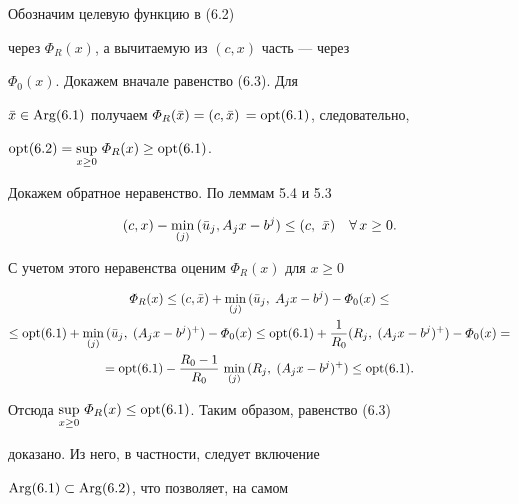 \begin{pf} Обозначим целевую функцию в (6.2)


через $\varPhi_R (x)$, а вычитаемую из $(c, x)$ часть --- через


$\varPhi_0 (x)$. Докажем вначале равенство (6.3). Для


$\Bar{x} \in\Arg(6.1)$ получаем $\varPhi_R (\Bar{x}) =


(c, \Bar{x})\, =\opt(6.1)$, следовательно,


$\operatorname{opt}(6.2)=\sup\limits_{x \ge 0}\, \varPhi_R (x) \ge\operatorname{opt}(6.1)$.





Докажем обратное неравенство. По леммам 5.4  и 5.3


$$


(c, x) -\min_{(j)}\, (\Bar{u}_j, A_j x -b^j) \le (c,\


\Bar{x})\quad \fo\, x \ge 0.


$$


С учетом этого неравенства оценим $\varPhi_R(x)$ для $x \ge 0$


\begin{multline}


\varPhi_R(x) \le (c, \Bar{x}) +\min\limits_{(j)}\,


(\Bar{u}_j, \;A_j x - b^j) -\varPhi_0 (x) \le \\


%


\le \opt(6.1) + \min\limits_{(j)}\, (\Bar{u}_j,\;


(A_j x - b^j)^+ ) - \varPhi_0(x) \le 


\opt(6.1)+ \frac{1}{R_0} (R_j,\;


(A_j x - b^j)^+ ) - \varPhi_0 (x) = \\


%


= \opt(6.1) - \frac{R_0 - 1}{R_0}\,


\min\limits_{(j)}\, (R_j,\; (A_j x - b^j)^+ ) \le


\opt(6.1).


\end{multline}


Отсюда $\sup\limits_{x \ge 0}\, \varPhi_R (x)


\le \opt(6.1)$. Таким образом, равенство (6.3)


доказано. Из него, в частности, следует включение


$\operatorname{Arg}(6.1) \subset \operatorname{Arg}(6.2)$, что позволяет, на самом



\end{pf}
